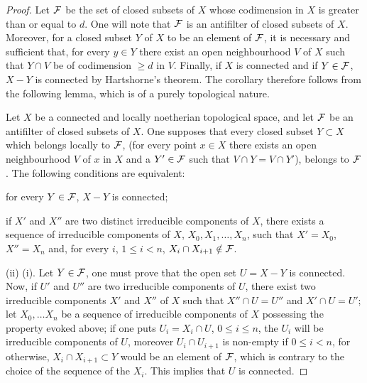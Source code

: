 \begin{proof}
Let ${\mathcal F}$ be the set of closed subsets of $X$ whose codimension in $X$ is greater than or equal to $d$. One will note that ${\mathcal F}$ is an antifilter of closed subsets of $X$. Moreover, for a closed subset $Y$ of $X$ to be an element of ${\mathcal F}$, it is necessary and sufficient that, for every $y\in Y$ there exist an open neighbourhood $V$ of $X$ such that $Y\cap V$ be of codimension $\geq d$ in $V$. Finally, if $X$ is connected and if $Y\in {\mathcal F}$, $X-Y$ is connected by Hartshorne's theorem. The corollary therefore follows from the following lemma, which is of a purely topological nature.

\begin{lemma} \label{III.3.8}
Let $X$ be a connected and locally noetherian topological space, and let ${\mathcal F}$ be an antifilter of closed subsets of $X$. One supposes that every closed subset $Y\subset X$ which belongs locally to ${\mathcal F}$, (\ie for every point $x\in X$ there exists an open neighbourhood $V$ of $x$ in $X$ and a $Y'\in {\mathcal F}$ such that $V\cap Y=V\cap Y'$), belongs to ${\mathcal F}$. The following conditions are equivalent:
\begin{enumeratei}

\item
for every $Y\in {\mathcal F}$, $X-Y$ is connected;

\item
if $X'$ and $X''$ are two distinct irreducible components of $X$, there exists a sequence of irreducible components of $X$, $X_0, X_1, \ldots, X_n$, such that $X'=X_0$, $X''=X_n$ and, for every $i$, $1\leq i< n$, $X_i \cap X_{i+1} \notin {\mathcal F}$.
\end{enumeratei}
\end{lemma}

(ii) \ALORS (i). Let $Y\in {\mathcal F}$, one must prove that the open set $U=X-Y$ is connected. Now, if $U'$ and $U''$ are two irreducible components of $U$, there exist two irreducible components $X'$ and $X''$ of $X$ such that $X''\cap U=U''$ and $X'\cap U=U'$; let $X_0, \ldots X_n$ be a sequence of irreducible components of $X$ possessing the property evoked above; if one puts $U_i=X_i\cap U$, $0\leq i\leq n$, the $U_i$ will be irreducible components of $U$, moreover $U_{i}\cap U_{i+1}$ is non-empty if $0\leq i< n$, for otherwise, {$X_{i}\cap X_{i+1} \subset Y$} would be an element of ${\mathcal F}$, which is contrary to the choice of the sequence of the $X_i$. This implies that $U$ is connected.


\end{proof}

